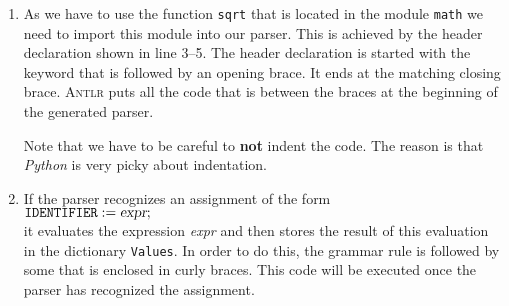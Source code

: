 \begin{enumerate}
\item As we have to use the function \texttt{sqrt} that is located in the module \texttt{math}
      we need to import this module into our parser.
      This is achieved by the header declaration shown in line 3--5.  The header declaration
      is started with the keyword \texttt{\@header} that is followed by an opening brace.
      It ends at the matching closing brace.
      \textsc{Antlr} puts all the code that is between the braces at the beginning of the generated parser.

      Note that we have to be careful to \textbf{not} indent the code.  The reason is that \textsl{Python} is
      very picky about indentation.
\item If the parser recognizes an assignment of the form
      \\[0.2cm]
      \hspace*{1.3cm}
      $\texttt{IDENTIFIER} \;\mathtt{:=}\; \textsl{expr} \mathtt{;}$
      \\[0.2cm]
      it evaluates the expression \textsl{expr} and then stores the result of this evaluation in
      the dictionary \texttt{Values}.  In order to do this, the grammar rule is followed by some
       that is enclosed in curly braces.  This code will be executed once the parser has 
      recognized the assignment.


\end{enumerate}
